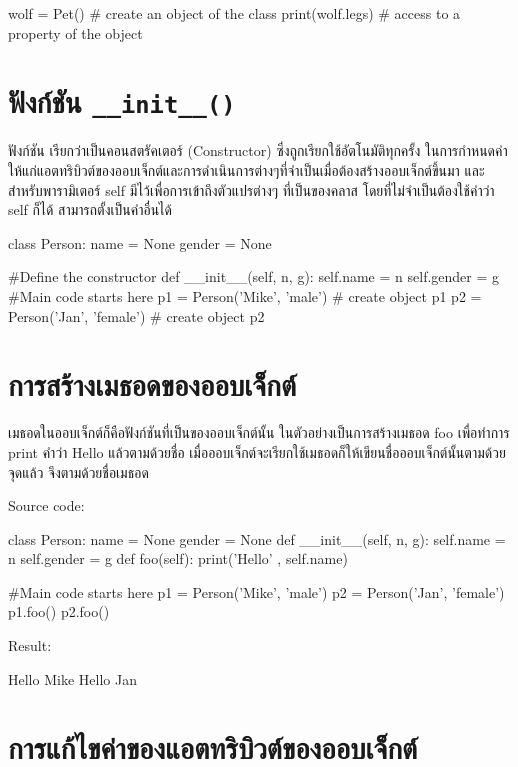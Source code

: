\begin{codelist}{}{}
wolf = Pet() # create an object of the class
print(wolf.legs) # access to a property of the object
\end{codelist}


\section{ฟังก์ชัน \texttt{\_\_init\_\_()}}

ฟังก์ชัน  เรียกว่าเป็นคอนสตรัคเตอร์  (Constructor) ซึ่งถูกเรียกใช้อัตโนมัติทุกครั้ง ในการกำหนดค่าให้แก่แอตทริบิวต์ของออบเจ็กต์และการดำเนินการต่างๆที่จำเป็นเมื่อต้องสร้างออบเจ็กต์ขึ้นมา และสำหรับพารามิเตอร์ self มีไว้เพื่อการเข้าถึงตัวแปรต่างๆ ที่เป็นของคลาส โดยที่ไม่จำเป็นต้องใช้คำว่า self ก็ได้ สามารถตั้งเป็นคำอื่นได้

\begin{codelist}{}{}
class Person:
    name = None
    gender = None
    
    #Define the constructor
    def __init__(self, n, g):
        self.name = n
        self.gender = g
#Main code starts here
p1 = Person('Mike', 'male') # create object p1
p2 = Person('Jan', 'female') # create object p2
\end{codelist}


\section{การสร้างเมธอดของออบเจ็กต์}

เมธอดในออบเจ็กต์ก็คือฟังก์ชันที่เป็นของออบเจ็กต์นั้น ในตัวอย่างเป็นการสร้างเมธอด foo เพื่อทำการ print คำว่า Hello แล้วตามด้วยชื่อ เมื่อออบเจ็กต์จะเรียกใช้เมธอดก็ให้เขียนชื่อออบเจ็กต์นั้นตามด้วยจุดแล้ว จึงตามด้วยชื่อเมธอด

Source code:
\begin{codelist}{}{}
class Person:
    name = None
    gender = None
    def __init__(self, n, g):
        self.name = n
        self.gender = g
    def foo(self):
        print('Hello' , self.name)

#Main code starts here
p1 = Person('Mike', 'male')
p2 = Person('Jan', 'female')
p1.foo()
p2.foo()
\end{codelist}

Result:
\begin{codelist}{}{}
Hello Mike
Hello Jan
\end{codelist}


\section{การแก้ไขค่าของแอตทริบิวต์ของออบเจ็กต์}

